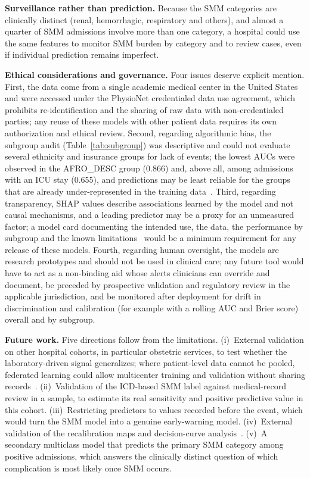 \documentclass[healthcare,article,submit,pdftex,moreauthors]{Definitions/mdpi}
\begin{document}
\textbf{Surveillance rather than prediction.} Because the SMM categories are
clinically distinct (renal, hemorrhagic, respiratory and others), and almost a quarter
of SMM admissions involve more than one category, a hospital could use the same
features to monitor SMM burden by category and to review cases, even if individual
prediction remains imperfect.

\textbf{Ethical considerations and governance.} Four issues deserve explicit mention. First, the data come from a single
academic medical center in the United States and were accessed under the PhysioNet credentialed data use agreement, which prohibits
re-identification and the sharing of raw data with non-credentialed parties; any reuse of these models with other patient
data requires its own authorization and ethical review. Second, regarding algorithmic bias, the subgroup audit
(Table~\ref{tab:subgroup}) was descriptive and could not evaluate several ethnicity and insurance groups for lack of events; the lowest AUCs were
observed in the AFRO\_DESC group (0.866) and, above all, among admissions with an ICU stay (0.655), and predictions may be least
reliable for the groups that are already under-represented in the training data~\cite{Obermeyer2019Bias,Rajkomar2018Fairness}.
Third, regarding transparency, SHAP values describe associations learned by the model and not causal mechanisms, and a leading
predictor may be a proxy for an unmeasured factor; a model card documenting the intended use, the data, the performance by subgroup and the known
limitations~\cite{Mitchell2019ModelCards} would be a minimum requirement for any release of these models. Fourth, regarding human oversight,
the models are research prototypes and should not be used in clinical care; any future tool would have to act as a non-binding
aid whose alerts clinicians can override and document, be preceded by prospective validation and regulatory review in the applicable
jurisdiction, and be monitored after deployment for drift in discrimination and calibration (for example with a rolling AUC and Brier score) overall and by subgroup.

\textbf{Future work.} Five directions follow from the limitations. (i)~External validation
on other hospital cohorts, in particular obstetric services, to test whether the
laboratory-driven signal generalizes; where patient-level data cannot be pooled, federated learning could allow
multicenter training and validation without sharing records~\cite{Rieke2020Federated,Dayan2021Federated}. (ii)~Validation of the ICD-based SMM label against
medical-record review in a sample, to estimate its real sensitivity and positive predictive
value in this cohort. (iii)~Restricting predictors to values recorded before the event, which would turn the SMM
model into a genuine early-warning model. (iv)~External validation of the recalibration maps and decision-curve analysis~\cite{Vickers2006DCA}. (v)~A secondary multiclass model that predicts the primary SMM category
among positive admissions, which answers the clinically distinct question of which complication
is most likely once SMM occurs.
\end{document}
